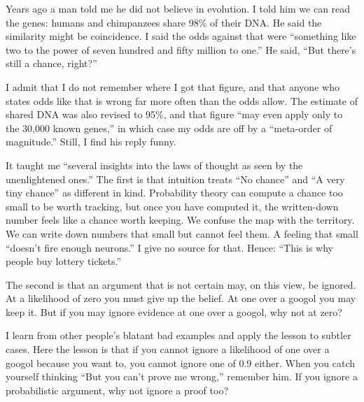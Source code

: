 
Years ago a man told me he did not believe in evolution. I told him we can read the genes: humans and chimpanzees share 98\% of their DNA. He said the similarity might be coincidence. I said the odds against that were ``something like two to the power of seven hundred and fifty million to one.'' He said, ``But there's still a chance, right?''

I admit that I do not remember where I got that figure, and that anyone who states odds like that is wrong far more often than the odds allow. The estimate of shared DNA was also revised to 95\%, and that figure ``may even apply only to the 30,000 known genes,'' in which case my odds are off by a ``meta-order of magnitude.''  Still, I find his reply funny.

It taught me ``several insights into the laws of thought as seen by the unenlightened ones.'' The first is that intuition treats ``No chance'' and ``A very tiny chance'' as different in kind.  Probability theory can compute a chance too small to be worth tracking, but once you have computed it, the written-down number feels like a chance worth keeping. We confuse the map with the territory. We can write down numbers that small but cannot feel them. A feeling that small ``doesn't fire enough neurons.'' I give no source for that. Hence: ``This is why people buy lottery tickets.''

The second is that an argument that is not certain may, on this view, be ignored. At a likelihood of zero you must give up the belief. At one over a googol you may keep it.  But if you may ignore evidence at one over a googol, why not at zero?

I learn from other people's blatant bad examples and apply the lesson to subtler cases. Here the lesson is that if you cannot ignore a likelihood of one over a googol because you want to, you cannot ignore one of 0.9 either. When you catch yourself thinking ``But you can't prove me wrong,'' remember him. If you ignore a probabilistic argument, why not ignore a proof too?
